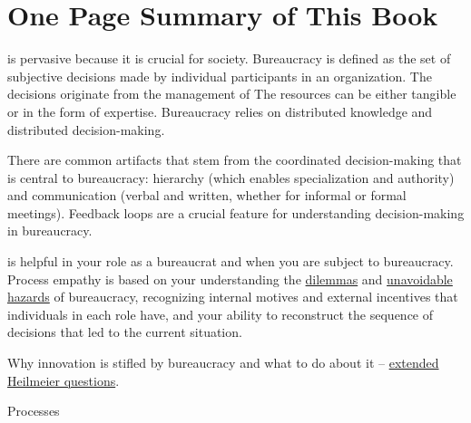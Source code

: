 \section*{One Page Summary of This Book}

\iftoggle{glossarysubstitutionworks}{\Gls{bureaucracy}}{Bureaucracy} is pervasive because it is crucial for society. Bureaucracy is defined as the set of subjective decisions made by individual participants in an organization. The decisions originate from the 
management of \iftoggle{glossarysubstitutionworks}{\glspl{shared resource}.}{shared resources.} 
The resources can be either tangible or in the form of expertise. Bureaucracy relies on
distributed knowledge and distributed decision-making.

There are common artifacts that stem from the coordinated decision-making that is central to bureaucracy: hierarchy (which enables specialization and authority) and communication (verbal and written, whether for informal or formal meetings). 
Feedback loops are a crucial feature for understanding decision-making in bureaucracy.

\iftoggle{glossarysubstitutionworks}{\Gls{process empathy}}{Process empathy} 
is helpful in your role as a bureaucrat and when you are subject to bureaucracy. 
Process empathy is based on your understanding the \hyperref[sec:dilemma-trilemma]{dilemmas} and \hyperref[sec:unavoidable-hazards]{unavoidable hazards} of bureaucracy, recognizing internal \gls{motives} and external \gls{incentives} that individuals in each role have, and your ability to reconstruct the sequence of decisions that led to the current situation. 


Why innovation is stifled by bureaucracy and what to do about it -- \hyperref[sec:extending-Heilmeier]{extended Heilmeier questions}.
\iftoggle{haspagenumbers}{page~\pageref{sec:extending-Heilmeier}}{}

Processes